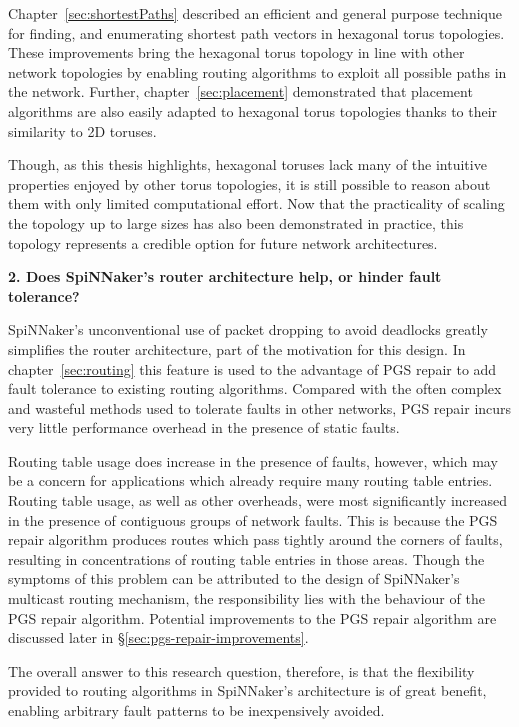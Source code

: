 		Chapter~\ref{sec:shortestPaths} described an efficient and general purpose
		technique for finding, and enumerating shortest path vectors in hexagonal
		torus topologies. These improvements bring the hexagonal torus topology in
		line with other network topologies by enabling routing algorithms to
		exploit all possible paths in the network. Further,
		chapter~\ref{sec:placement} demonstrated that placement algorithms are also
		easily adapted to hexagonal torus topologies thanks to their similarity to
		2D toruses.
		
		Though, as this thesis highlights, hexagonal toruses lack many of the
		intuitive properties enjoyed by other torus topologies, it is still
		possible to reason about them with only limited computational effort.  Now
		that the practicality of scaling the topology up to large sizes has also
		been demonstrated in practice, this topology represents a credible option
		for future network architectures.
		
		\vspace*{1.0em}
		\noindent%
		\textbf{2. Does SpiNNaker's router architecture help, or hinder fault
		tolerance?}
		
		SpiNNaker's unconventional use of packet dropping to avoid deadlocks
		greatly simplifies the router architecture, part of the motivation for this
		design. In chapter~\ref{sec:routing} this feature is used to the advantage
		of PGS repair to add fault tolerance to existing routing algorithms.
		Compared with the often complex and wasteful methods used to tolerate
		faults in other networks, PGS repair incurs very little performance
		overhead in the presence of static faults.
		
		Routing table usage does increase in the presence of faults, however, which
		may be a concern for applications which already require many routing table
		entries. Routing table usage, as well as other overheads, were most
		significantly increased in the presence of contiguous groups of network
		faults. This is because the PGS repair algorithm produces routes which pass
		tightly around the corners of faults, resulting in concentrations of
		routing table entries in those areas.  Though the symptoms of this problem
		can be attributed to the design of SpiNNaker's multicast routing mechanism,
		the responsibility lies with the behaviour of the PGS repair algorithm.
		Potential improvements to the PGS repair algorithm are discussed later in
		\S\ref{sec:pgs-repair-improvements}.
		
		The overall answer to this research question, therefore, is that the
		flexibility provided to routing algorithms in SpiNNaker's architecture is
		of great benefit, enabling arbitrary fault patterns to be inexpensively
		avoided.
		
